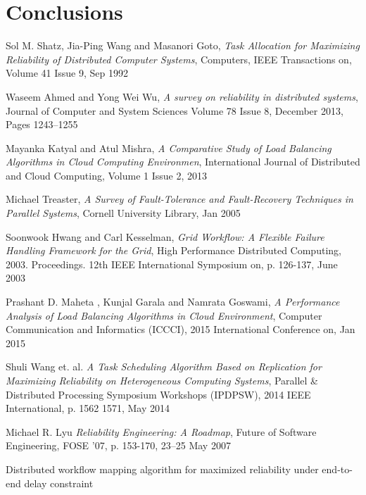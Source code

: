 \documentclass{cslthse-msc}
\begin{document}
\chapter{Conclusions} \label{ch:conclusions}

\begin{thebibliography}{50}

	Sol M. Shatz, Jia-Ping Wang and Masanori Goto,
	\emph{Task Allocation for Maximizing Reliability of Distributed Computer Systems},
	Computers, IEEE Transactions on, Volume 41  Issue 9,
	Sep 1992
	
	Waseem Ahmed and Yong Wei Wu,
	\emph{A survey on reliability in distributed systems},
	Journal of Computer and System Sciences Volume 78 Issue 8,
	December 2013, Pages 1243–1255

	Mayanka Katyal and Atul Mishra,
	\emph{A Comparative Study of Load Balancing Algorithms in Cloud Computing Environmen},
	International Journal of Distributed and Cloud Computing, Volume 1 Issue 2,
	2013

	Michael Treaster,
	\emph{A Survey of Fault-Tolerance and Fault-Recovery Techniques in Parallel Systems},
	Cornell University Library,
	Jan 2005

	Soonwook Hwang and Carl Kesselman,
	\emph{Grid Workflow: A Flexible Failure Handling Framework for the Grid},
	High Performance Distributed Computing, 2003. Proceedings. 12th IEEE International Symposium on, p. 	126-137, 
	June 2003

	Prashant D. Maheta , Kunjal Garala and Namrata Goswami,
	\emph{A Performance Analysis of Load Balancing Algorithms in Cloud Environment},
	Computer Communication and Informatics (ICCCI), 2015 International Conference on,
	Jan 2015
	
	Shuli Wang et. al.
	\emph{A Task Scheduling Algorithm Based on Replication for Maximizing Reliability on Heterogeneous Computing Systems},
	Parallel \& Distributed Processing Symposium Workshops (IPDPSW), 2014 IEEE International, p. 1562 1571, 
	May 2014

	Michael R. Lyu
	\emph{Reliability Engineering: A Roadmap},
	Future of Software Engineering, FOSE ’07, p. 153-170,
	23–25 May 2007
	
Distributed workflow mapping algorithm for maximized reliability under end-to-end delay constraint


\end{thebibliography}
\end{document}
